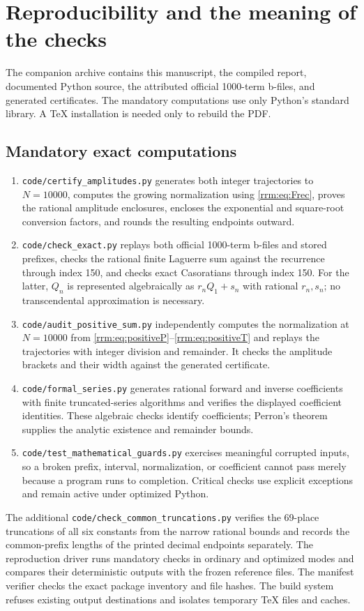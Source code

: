 \documentclass[11pt]{article}
\theoremstyle{remark}\newtheorem{remark}[theorem]{Remark}
\begin{document}
\section{Reproducibility and the meaning of the checks}\label{rrm:sec:repro}
The companion archive contains this manuscript, the compiled report, documented Python source, the attributed official 1000-term b-files, and generated certificates. The mandatory computations use only Python's standard library. A TeX installation is needed only to rebuild the PDF.

\subsection{Mandatory exact computations}
\begin{enumerate}
\item \texttt{code/certify\_amplitudes.py} generates both integer trajectories to $N=10000$, computes the growing normalization using \eqref{rrm:eq:Frec}, proves the rational amplitude enclosures, encloses the exponential and square-root conversion factors, and rounds the resulting endpoints outward.
\item \texttt{code/check\_exact.py} replays both official 1000-term b-files and stored prefixes, checks the rational finite Laguerre sum against the recurrence through index 150, and checks exact Casoratians through index 150. For the latter, $Q_n$ is represented algebraically as $r_nQ_1+s_n$ with rational $r_n,s_n$; no transcendental approximation is necessary.
\item \texttt{code/audit\_positive\_sum.py} independently computes the normalization at $N=10000$ from \eqref{rrm:eq:positiveP}--\eqref{rrm:eq:positiveT} and replays the trajectories with integer division and remainder. It checks the amplitude brackets and their width against the generated certificate.
\item \texttt{code/formal\_series.py} generates rational forward and inverse coefficients with finite truncated-series algorithms and verifies the displayed coefficient identities. These algebraic checks identify coefficients; Perron's theorem supplies the analytic existence and remainder bounds.
\item \texttt{code/test\_mathematical\_guards.py} exercises meaningful corrupted inputs, so a broken prefix, interval, normalization, or coefficient cannot pass merely because a program runs to completion. Critical checks use explicit exceptions and remain active under optimized Python.
\end{enumerate}
The additional \texttt{code/check\_common\_truncations.py} verifies the 69-place truncations of all six constants from the narrow rational bounds and records the common-prefix lengths of the printed decimal endpoints separately. The reproduction driver runs mandatory checks in ordinary and optimized modes and compares their deterministic outputs with the frozen reference files. The manifest verifier checks the exact package inventory and file hashes. The build system refuses existing output destinations and isolates temporary TeX files and caches.
\end{document}
